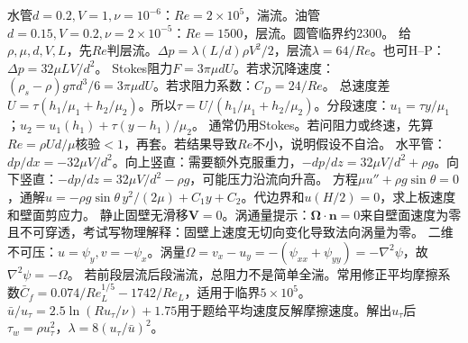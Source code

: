 水管$d=0.2,V=1,\nu=10^{-6}$：$Re=2\times10^5$，湍流。油管$d=0.15,V=0.2,\nu=2\times10^{-5}$：$Re=1500$，层流。圆管临界约2300。
给$\rho,\mu,d,V,L$，先$Re$判层流。$\Delta p=\lambda(L/d)\rho V^2/2$，层流$\lambda=64/Re$。也可H--P：$\Delta p=32\mu LV/d^2$。
Stokes阻力$F=3\pi\mu dU$。若求沉降速度：$(\rho_s-\rho)g\pi d^3/6=3\pi\mu dU$。若求阻力系数：$C_D=24/Re$。
总速度差$U=\tau(h_1/\mu_1+h_2/\mu_2)$。所以$\tau=U/(h_1/\mu_1+h_2/\mu_2)$。分段速度：$u_1=\tau y/\mu_1$；$u_2=u_1(h_1)+\tau(y-h_1)/\mu_2$。
通常仍用Stokes。若问阻力或终速，先算$Re=\rho Ud/\mu$核验$<1$，再套。若结果导致$Re$不小，说明假设不自洽。
水平管：$dp/dx=-32\mu V/d^2$。向上竖直：需要额外克服重力，$-dp/dz=32\mu V/d^2+\rho g$。向下竖直：$-dp/dz=32\mu V/d^2-\rho g$，可能压力沿流向升高。
方程$\mu u''+\rho g\sin\theta=0$，通解$u=-\rho g\sin\theta\,y^2/(2\mu)+C_1y+C_2$。代边界和$u(H/2)=0$，求上板速度和壁面剪应力。
静止固壁无滑移$\bm V=0$。涡通量提示：$\bm\Omega\cdot\bm n=0$来自壁面速度为零且不可穿透，考试写物理解释：固壁上速度无切向变化导致法向涡量为零。
二维不可压：$u=\psi_y,v=-\psi_x$。涡量$\Omega=v_x-u_y=-(\psi_{xx}+\psi_{yy})=-\nabla^2\psi$，故$\nabla^2\psi=-\Omega$。
若前段层流后段湍流，总阻力不是简单全湍。常用修正平均摩擦系数$\bar C_f=0.074/Re_L^{1/5}-1742/Re_L$，适用于临界$5\times10^5$。
$\bar u/u_\tau=2.5\ln(Ru_\tau/\nu)+1.75$用于题给平均速度反解摩擦速度。解出$u_\tau$后$\tau_w=\rho u_\tau^2$，$\lambda=8(u_\tau/\bar u)^2$。

